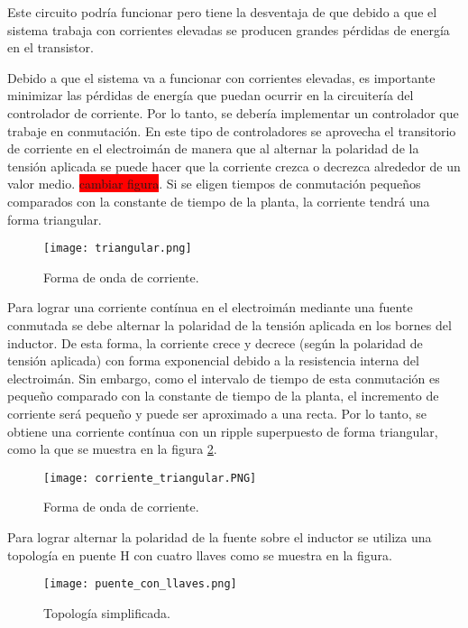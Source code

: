 Este circuito podría funcionar pero tiene la desventaja de que debido a que el sistema trabaja con corrientes elevadas se producen grandes pérdidas de energía en el transistor. 

Debido a que el sistema va a funcionar con corrientes elevadas, es importante minimizar las pérdidas de energía que puedan ocurrir en la circuitería del controlador de corriente. Por lo tanto, se debería implementar un controlador que trabaje en conmutación.  En este tipo de controladores se aprovecha el transitorio de corriente en el electroimán de manera que al alternar la polaridad de la tensión aplicada se puede hacer que la corriente crezca o decrezca alrededor de un valor medio. \colorbox{red}{cambiar figura}. Si se eligen tiempos de conmutación pequeños comparados con la constante de tiempo de la planta, la corriente tendrá una forma triangular.

\begin{figure}[H]
	\centering
	\texttt{[image: triangular.png]}
	\caption{Forma de onda de corriente.}
	\label{fig:img_corriente_triangular}
\end{figure}


\noindent Para lograr una corriente contínua en el electroimán mediante una fuente conmutada se debe alternar la polaridad de la tensión aplicada en los bornes del inductor. De esta forma, la corriente crece y decrece (según la polaridad de tensión aplicada) con forma exponencial debido a la resistencia interna del electroimán. Sin embargo, como el intervalo de tiempo de esta conmutación es pequeño comparado con la constante de tiempo de la planta, el incremento de corriente será pequeño y puede ser aproximado a una recta. Por lo tanto, se obtiene una corriente contínua con un ripple superpuesto de forma triangular, como la que se muestra en la figura \ref{fig:img_corriente_triangular_2}. 

\begin{figure}[H]
	\centering
	\texttt{[image: corriente\_triangular.PNG]}
	\caption{Forma de onda de corriente.}
	\label{fig:img_corriente_triangular_2}
\end{figure}


\noindent Para lograr alternar la polaridad de la fuente sobre el inductor se utiliza una topología en puente H con cuatro llaves como se  muestra en la figura.

\begin{figure}[H]
	\centering
	\texttt{[image: puente\_con\_llaves.png]}
	\caption{Topología simplificada.}
	\label{fig:img_topologia_simplificada}
\end{figure} 

